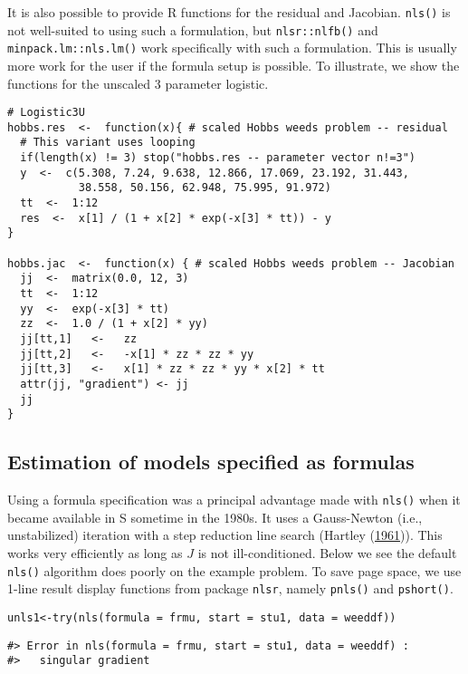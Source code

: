 It is also possible to provide R functions for the residual and Jacobian.
\texttt{nls()} is not well-suited to using such a formulation, but \texttt{nlsr::nlfb()}
and \texttt{minpack.lm::nls.lm()} work specifically with such a formulation.
This is usually more work for the user if the formula setup is possible.
To illustrate, we show the functions for the unscaled 3 parameter logistic.

\begin{verbatim}
# Logistic3U
hobbs.res  <-  function(x){ # scaled Hobbs weeds problem -- residual
  # This variant uses looping
  if(length(x) != 3) stop("hobbs.res -- parameter vector n!=3")
  y  <-  c(5.308, 7.24, 9.638, 12.866, 17.069, 23.192, 31.443, 
           38.558, 50.156, 62.948, 75.995, 91.972)
  tt  <-  1:12
  res  <-  x[1] / (1 + x[2] * exp(-x[3] * tt)) - y
}

hobbs.jac  <-  function(x) { # scaled Hobbs weeds problem -- Jacobian
  jj  <-  matrix(0.0, 12, 3)
  tt  <-  1:12
  yy  <-  exp(-x[3] * tt)
  zz  <-  1.0 / (1 + x[2] * yy)
  jj[tt,1]   <-   zz
  jj[tt,2]   <-   -x[1] * zz * zz * yy
  jj[tt,3]   <-   x[1] * zz * zz * yy * x[2] * tt
  attr(jj, "gradient") <- jj
  jj
}
\end{verbatim}

\hypertarget{estimation-of-models-specified-as-formulas}{%
\subsection{Estimation of models specified as formulas}\label{estimation-of-models-specified-as-formulas}}

Using a formula specification was a principal advantage made
with \texttt{nls()} when it became available in S sometime in the 1980s. It uses a
Gauss-Newton (i.e., unstabilized) iteration with a step reduction line
search (Hartley (\protect\hyperlink{ref-Hartley1961}{1961})). This works very efficiently as long as \(J\) is not ill-conditioned.
Below we see the default \texttt{nls()} algorithm does poorly on the example problem.
To save page space, we use 1-line result display functions from package \texttt{nlsr},
namely \texttt{pnls()} and \texttt{pshort()}.

\begin{verbatim}
unls1<-try(nls(formula = frmu, start = stu1, data = weeddf))
\end{verbatim}

\begin{verbatim}
#> Error in nls(formula = frmu, start = stu1, data = weeddf) : 
#>   singular gradient
\end{verbatim}

